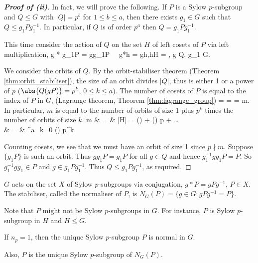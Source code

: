 \begin{proof}[\bf Proof of (ii)]
In fact, we will prove the following. If $P$ is a Sylow $p$-subgroup and $Q \leq G$ with $|Q| = p^b$ for $1 \leq b \leq a$, then there exists $g_1 \in G$ such that $Q \leq g_1Pg^{-1}_1$. In particular, if $Q$ is of order $p^a$ then $Q = g_1Pg^{-1}_1$.

This time consider the action of $Q$ on the set $H$ of left cosets of $P$ via left multiplication,
\be
g * g_1P = gg_1P \ \lra \ g*h = gh,\quad h\in H = , g \in Q, g_1 \in G.
\ee

We consider the orbits of $Q$. By the orbit-stabiliser theorem (Theorem \ref{thm:orbit_stabiliser}), the size of an orbit divides $|Q|$, thus is either 1 or a power of $p$ ($\abs{Q(gP)} = p^k$, $0\leq k\leq a$).
The number of cosets of $P$ is equal to the index of $P$ in $G$, (Lagrange theorem, Theorem \ref{thm:lagrange_group})
\be
{} =  =  = m.
\ee
In particular, $m$ is equal to the number of orbits of size 1 plus $p^k$ times the number of orbits of size $k$.
\beast
m & = & |H| = ()   + () \cdot p  + \dots\\
& = & \sum^a_{k=0} () \cdot p^k.
\eeast

Counting cosets, we see that we must have an orbit of size 1 since $p \nmid m$. Suppose $\{g_1P\}$ is such an orbit. Thus $gg_1P = g_1P$ for all $g \in Q$ and hence $g^{-1}_1 gg_1P = P$. So $g^{-1}_1 gg_1 \in P$ and $g \in g_1Pg^{-1}_1$. Thus $Q \leq g_1Pg^{-1}_1$, as required.
\end{proof}

\begin{definition}[normaliser]\label{def:normaliser}
$G$ acts on the set $X$ of Sylow $p$-subgroups via conjugation, $g* P = gPg^{-1}$, $P\in X$. The stabiliser, called the normaliser of $P$, is $N_G(P) = \{g \in G : gPg^{-1} = P\}$.
\end{definition}

\begin{remark}
Note that $P$ might not be Sylow $p$-subgroups in $G$. For instance, $P$ is Sylow $p$-subgroup in $H$ and $H\leq G$.
\end{remark}


\begin{lemma}\label{lem:unique_sylow_in_normaliser}
If $n_p = 1$, then the unique Sylow $p$-subgroup $P$ is normal in $G$.

Also, $P$ is the unique Sylow $p$-subgroup of $N_G(P)$.
\end{lemma}

